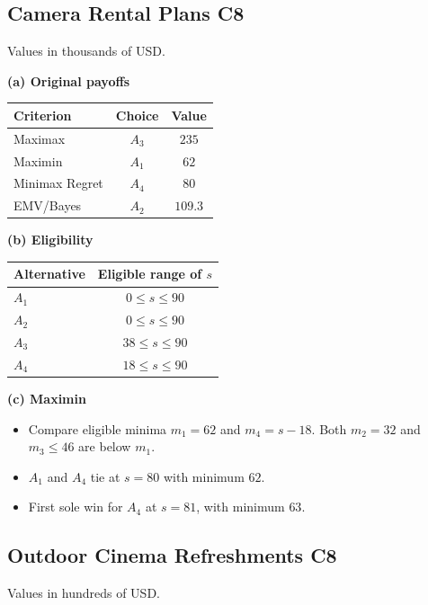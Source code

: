 {\small
\subsection{Camera Rental Plans \hfill C8}
\noindent Values in thousands of USD.

\noindent\begin{minipage}[t]{0.35\textwidth}
  \vspace{0pt}
  \textbf{(a) Original payoffs}\par\smallskip
  \setlength{\tabcolsep}{3pt}
  \begin{tabular}{@{}lcc@{}}
    \toprule
    Criterion & Choice & Value\\ \midrule
    Maximax & $A_3$ & $235$\\
    Maximin & $A_1$ & $62$\\
    Minimax Regret & $A_4$ & $80$\\
    EMV/Bayes & $A_2$ & $109.3$\\
    \bottomrule
  \end{tabular}
\end{minipage}\hfill
\begin{minipage}[t]{0.62\textwidth}
  \vspace{0pt}
  \textbf{(b) Eligibility}\par\smallskip
  \begin{tabular}{@{}lc@{}}
    \toprule
    Alternative & Eligible range of $s$\\ \midrule
    $A_1$ & $0\le s\le90$\\
    $A_2$ & $0\le s\le90$\\
    $A_3$ & $38\le s\le90$\\
    $A_4$ & $18\le s\le90$\\
    \bottomrule
  \end{tabular}\par\smallskip
  \textbf{(c) Maximin}
  \begin{itemize}[leftmargin=*,nosep]
    \item Compare eligible minima $m_1=62$ and $m_4=s-18$. Both $m_2=32$ and $m_3\le46$ are below $m_1$.
    \item $A_1$ and $A_4$ tie at $s=80$ with minimum $62$.
    \item First sole win for $A_4$ at $\boxed{s=81}$, with minimum $63$.
  \end{itemize}
\end{minipage}

\subsection{Outdoor Cinema Refreshments \hfill C8}
\noindent Values in hundreds of USD.

}
